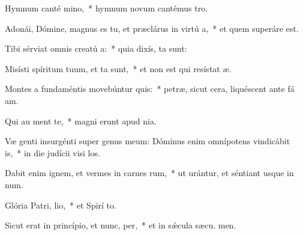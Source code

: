 \item Hymnum canté mino,~* hymnum novum cantémus  tro.
\item Adonái, Dómine, magnus es tu, et præclárus in virtú a,~* et quem superáre  est.
\item Tibi sérviat omnis creatú a:~* quia dixís,  ta sunt:
\item Misísti spíritum tuum, et ta sunt,~* et non est qui resístat  æ.
\item Montes a fundaméntis movebúntur  quis:~* petræ, sicut cera, liquéscent ante fá am.
\item Qui au ment te,~* magni erunt apud   nia.
\item Væ genti insurgénti super genus meum: Dóminus enim omnípotens vindicábit  is,~* in die judícii visi los.
\item Dabit enim ignem, et vermes in carnes rum,~* ut urántur, et séntiant usque in num.
\item Glória Patri,  lio,~* et Spirí to.
\item Sicut erat in princípio, et nunc,  per,~* et in sǽcula sæcu. men.
